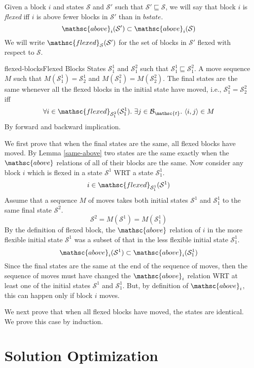 \documentclass{article}
\newcommand{\have}{{.~}}
\newcommand{\bstate}{{\mathcal{S}}}
\newcommand{\blocks}{{\mathcal{B}}}
\newcommand{\tabtop}{{\mathsc{t}}}
\newcommand{\tblocks}{{\blocks_\tabtop}}
\newcommand{\babove}{{\mathsc{above}}}
\newcommand{\bflexed}{{\mathsc{flexed}}}
\begin{document}
Given a block $i$ and states $\bstate$ and $\bstate'$ such
that $\bstate' \sqsubseteq \bstate$, we will say that block
$i$ is {\em flexed} iff $i$ is above fewer blocks in
$\bstate'$ than in $bstate$. $$
  \babove_i(\bstate') \subset \babove_i(\bstate)
$$
We will write $\bflexed_{\bstate}(\bstate')$ for the
set of blocks in $\bstate'$ flexed with respect to $\bstate$.

\begin{theorem}{flexed-blocks}{Flexed Blocks}
\given States $\bstate^1_1$ and $\bstate^2_1$ such that
$\bstate^1_1 \sqsubseteq \bstate^2_1$.  A
move sequence $M$ such that $M(\bstate^1_1) = \bstate^1_2$
and $M(\bstate^2_1) = M(\bstate^2_2)$.
\prove
The final states are the same whenever all the flexed blocks
in the initial state have moved, i.e.,
$\bstate^2_1 = \bstate^2_2$ iff $$
  \forall i \in \bflexed_{\bstate^2_1}(\bstate^1_1) \have
    \exists j \in \tblocks \have
      \langle i, j \rangle \in M
$$
\proof  By forward and backward implication.

\forwardcase
We first prove that when the final states are the same, all
flexed blocks have moved.
By Lemma \ref{same-above} two states are the same exactly when the
$\babove$ relations of all of their blocks are the same.
Now consider any block $i$ 
which is flexed in a state $\bstate^1$ WRT a state $\bstate^1_1$. $$
  i \in \bflexed_{\bstate^1_1}(\bstate^1)
$$
Assume that a sequence $M$ of moves takes both
initial states $\bstate^1$ and $\bstate^1_1$
to the same final state $\bstate^2$. $$
  \bstate^2 = M(\bstate^1) = M(\bstate^1_1)
$$
By the definition of flexed
block, the $\babove$ relation of $i$ in the
more flexible initial state $\bstate^1$ was a subset
of that in the less flexible initial state $\bstate^1_1$. $$
   \babove_i(\bstate^1) \subset \babove_i(\bstate^1_1)
$$
Since the final
states are the same at the end of the sequence of moves, then
the sequence of moves must have changed the $\babove_i$ relation
WRT at least one of the initial states $\bstate^1$ and $\bstate^1_1$.
But, by definition of $\babove_i$, this can happen only if block $i$ moves.

\backwardcase
We next prove that when all flexed blocks have moved, the states are
identical.  We prove this case by induction.

\end{theorem}
  
\section{Solution Optimization}
\end{document}
